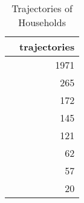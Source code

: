 \begin{table}
\centering
\caption{Trajectories of Households}
\label{tbl:trajectories}
\begin{tabular}{lr}
\toprule
{} &  trajectories \\
\midrule
[0.0, 0.0, 0.0] &          1971 \\
[1.0, 1.0, 1.0] &           265 \\
[0.0, 0.0, 1.0] &           172 \\
[0.0, 1.0, 1.0] &           145 \\
[0.0, 1.0, 0.0] &           121 \\
[1.0, 1.0, 0.0] &            62 \\
[1.0, 0.0, 0.0] &            57 \\
[1.0, 0.0, 1.0] &            20 \\
\bottomrule
\end{tabular}
\end{table}
